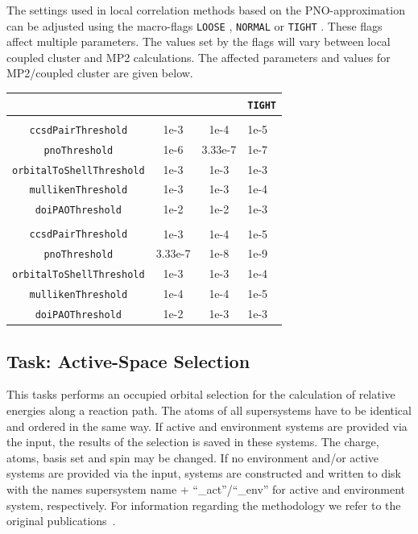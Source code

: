 \documentclass[bibliography=totocnumbered,a4paper,10pt,oneside]{scrbook}
\newcommand{\ttt}[1]{%
  \begingroup\setlength{\fboxsep}{1pt}%
  \colorbox{serenity-green!30}{\texttt{\hspace*{2pt}\vphantom{(g}#1\hspace*{2pt}}}%
  \endgroup
}
\begin{document}
The settings used in local correlation methods based on the PNO-approximation can
be adjusted using the macro-flags \ttt{LOOSE}, \ttt{NORMAL} or \ttt{TIGHT}.
These flags affect multiple parameters. The values set by the flags will vary between
local coupled cluster and MP2 calculations. The affected parameters and values for
MP2/coupled cluster are given below.

\begin{table}[H]\small \centering \begin{tabular}{|>{\ttfamily}c|>{\ttfamily}c|>{\ttfamily}c|l|}\hline
   & \multicolumn{1}{c|}{\texttt{LOOSE}}& \multicolumn{1}{c|}{\texttt{NORMAL}}& \multicolumn{1}{c|}{\texttt{TIGHT}}\\\hline
   \multicolumn{4}{|c|}{\texttt{Local Coupled Cluster}}  \\\hline
  \texttt{ccsdPairThreshold}       &  1e-3  & 1e-4     & 1e-5    \\\hline
  \texttt{pnoThreshold}            &  1e-6  & 3.33e-7  & 1e-7    \\\hline
  \texttt{orbitalToShellThreshold} &  1e-3  & 1e-3     & 1e-3    \\\hline
  \texttt{mullikenThreshold}       &  1e-3  & 1e-3     & 1e-4    \\\hline
  \texttt{doiPAOThreshold}         &  1e-2  & 1e-2     & 1e-3    \\\hline
  \multicolumn{4}{|c|}{\texttt{Local MP2}}  \\\hline
  \texttt{ccsdPairThreshold}       &  1e-3     &  1e-4 & 1e-5    \\\hline
  \texttt{pnoThreshold}            &  3.33e-7  &  1e-8 & 1e-9    \\\hline
  \texttt{orbitalToShellThreshold} &  1e-3     &  1e-3 & 1e-4    \\\hline
  \texttt{mullikenThreshold}       &  1e-4     &  1e-4 & 1e-5    \\\hline
  \texttt{doiPAOThreshold}         &  1e-2     &  1e-3 & 1e-3    \\\hline
\end{tabular}
\end{table}

\subsection{Task: Active-Space Selection\label{sec:activeSpaceTask}}
This tasks performs an occupied orbital selection for the calculation of relative
energies along a reaction path. The atoms of all supersystems have to be identical
and ordered in the same way. If active and environment systems are provided via the
input, the results of the selection is saved in these systems. The charge, atoms, basis
set and spin may be changed. If no environment and/or active systems are provided
via the input, systems are constructed and written to disk with the names
supersystem name + ``\_act''/``\_env'' for active and environment system, respectively.
For information regarding the methodology we refer to the original publications~\cite{Bensberg2019a,Bensberg2020}.
\end{document}
